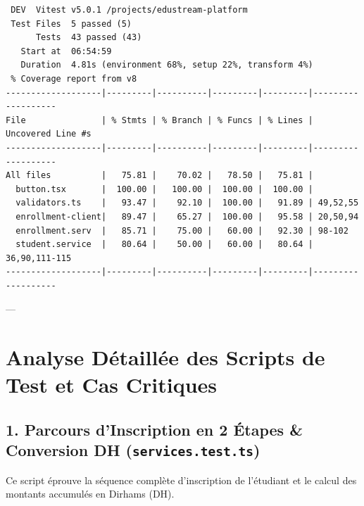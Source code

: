 \documentclass[12pt,a4paper]{article}
\begin{document}
\begin{tcolorbox}[terminalbox]
\small
\begin{verbatim}
 DEV  Vitest v5.0.1 /projects/edustream-platform
 Test Files  5 passed (5)
      Tests  43 passed (43)
   Start at  06:54:59
   Duration  4.81s (environment 68%, setup 22%, transform 4%)
 % Coverage report from v8
-------------------|---------|----------|---------|---------|-------------------
File               | % Stmts | % Branch | % Funcs | % Lines | Uncovered Line #s 
-------------------|---------|----------|---------|---------|-------------------
All files          |   75.81 |    70.02 |   78.50 |   75.81 |                   
  button.tsx       |  100.00 |   100.00 |  100.00 |  100.00 |                   
  validators.ts    |   93.47 |    92.10 |  100.00 |   91.89 | 49,52,55          
  enrollment-client|   89.47 |    65.27 |  100.00 |   95.58 | 20,50,94          
  enrollment.serv  |   85.71 |    75.00 |   60.00 |   92.30 | 98-102            
  student.service  |   80.64 |    50.00 |   60.00 |   80.64 | 36,90,111-115     
-------------------|---------|----------|---------|---------|-------------------
\end{verbatim}
\end{tcolorbox}

---

\section{Analyse Détaillée des Scripts de Test et Cas Critiques}

\subsection{1. Parcours d'Inscription en 2 Étapes \& Conversion DH (\texttt{services.test.ts})}
Ce script éprouve la séquence complète d'inscription de l'étudiant et le calcul des montants accumulés en Dirhams (DH).
\end{document}
